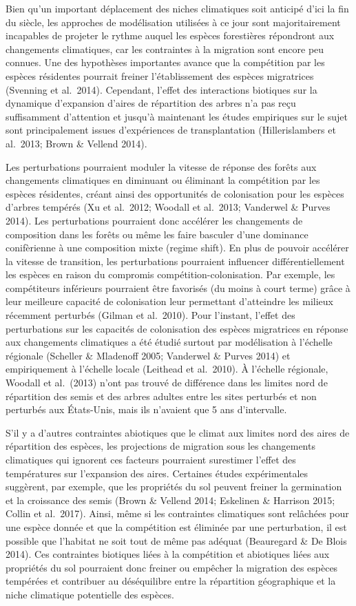 Bien qu'un important déplacement des niches climatiques soit anticipé
d'ici la fin du siècle, les approches de modélisation utilisées à ce
jour sont majoritairement incapables de projeter le rythme auquel les
espèces forestières répondront aux changements climatiques, car les
contraintes à la migration sont encore peu connues. Une des hypothèses
importantes avance que la compétition par les espèces résidentes
pourrait freiner l'établissement des espèces migratrices (Svenning et
al.~2014). Cependant, l'effet des interactions biotiques sur la
dynamique d'expansion d'aires de répartition des arbres n'a pas reçu
suffisamment d'attention et jusqu'à maintenant les études empiriques sur
le sujet sont principalement issues d'expériences de transplantation
(Hillerislambers et al.~2013; Brown \& Vellend 2014).

Les perturbations pourraient moduler la vitesse de réponse des forêts
aux changements climatiques en diminuant ou éliminant la compétition par
les espèces résidentes, créant ainsi des opportunités de colonisation
pour les espèces d'arbres tempérés (Xu et al.~2012; Woodall et al.~2013;
Vanderwel \& Purves 2014). Les perturbations pourraient donc accélérer
les changements de composition dans les forêts ou même les faire
basculer d'une dominance conifèrienne à une composition mixte (regime
shift). En plus de pouvoir accélérer la vitesse de transition, les
perturbations pourraient influencer différentiellement les espèces en
raison du compromis compétition-colonisation. Par exemple, les
compétiteurs inférieurs pourraient être favorisés (du moins à court
terme) grâce à leur meilleure capacité de colonisation leur permettant
d'atteindre les milieux récemment perturbés (Gilman et al.~2010). Pour
l'instant, l'effet des perturbations sur les capacités de colonisation
des espèces migratrices en réponse aux changements climatiques a été
étudié surtout par modélisation à l'échelle régionale (Scheller \&
Mladenoff 2005; Vanderwel \& Purves 2014) et empiriquement à l'échelle
locale (Leithead et al.~2010). À l'échelle régionale, Woodall et
al.~(2013) n'ont pas trouvé de différence dans les limites nord de
répartition des semis et des arbres adultes entre les sites perturbés et
non perturbés aux États-Unis, mais ils n'avaient que 5 ans d'intervalle.

S'il y a d'autres contraintes abiotiques que le climat aux limites nord
des aires de répartition des espèces, les projections de migration sous
les changements climatiques qui ignorent ces facteurs pourraient
surestimer l'effet des températures sur l'expansion des aires. Certaines
études expérimentales suggèrent, par exemple, que les propriétés du sol
peuvent freiner la germination et la croissance des semis (Brown \&
Vellend 2014; Eskelinen \& Harrison 2015; Collin et al.~2017). Ainsi,
même si les contraintes climatiques sont relâchées pour une espèce
donnée et que la compétition est éliminée par une perturbation, il est
possible que l'habitat ne soit tout de même pas adéquat (Beauregard \&
De Blois 2014). Ces contraintes biotiques liées à la compétition et
abiotiques liées aux propriétés du sol pourraient donc freiner ou
empêcher la migration des espèces tempérées et contribuer au
déséquilibre entre la répartition géographique et la niche climatique
potentielle des espèces.

